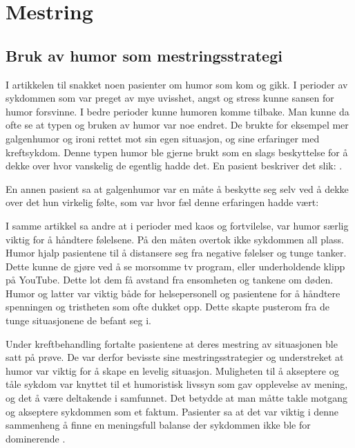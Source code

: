 \section{Mestring}

\subsection{Bruk av humor som mestringsstrategi}

I artikkelen til  snakket noen pasienter om humor som kom
og gikk. I perioder av sykdommen som var preget av mye uvisshet, angst og
stress kunne sansen for humor forsvinne. I bedre perioder kunne humoren komme
tilbake.  Man kunne da ofte se at typen og bruken av humor var noe endret. De
brukte for eksempel mer galgenhumor og ironi rettet mot sin egen situasjon, og
sine erfaringer med kreftsykdom. Denne typen humor ble gjerne brukt som en
slags beskyttelse for å dekke over hvor vanskelig de egentlig hadde det. En
pasient beskriver det slik: .

En annen pasient sa at galgenhumor var en måte å beskytte seg selv ved å dekke
over det hun virkelig følte, som var hvor fæl denne erfaringen hadde vært:

I samme artikkel sa andre at i perioder med kaos og fortvilelse, var humor
særlig viktig for å håndtere følelsene. På den måten overtok ikke sykdommen all
plass. Humor hjalp pasientene til å distansere seg fra negative følelser og
tunge tanker. Dette kunne de gjøre ved å se morsomme tv program, eller
underholdende klipp på YouTube. Dette lot dem få avstand fra ensomheten og
tankene om døden. Humor og latter var viktig både for helsepersonell og
pasientene for å håndtere spenningen og tristheten som ofte dukket opp. Dette
skapte pusterom fra de tunge situasjonene de befant seg i.

Under kreftbehandling fortalte pasientene at deres mestring av situasjonen ble
satt på prøve. De var derfor bevisste sine mestringsstrategier og understreket
at humor var viktig for å skape en levelig situasjon. Muligheten til å
akseptere og tåle sykdom var knyttet til et humoristisk livssyn som gav
opplevelse av mening, og det å være deltakende i samfunnet. Det betydde at man
måtte takle motgang og akseptere sykdommen som et faktum. Pasienter sa at det
var viktig i denne sammenheng å finne en meningsfull balanse der sykdommen ikke
ble for dominerende \cite{roaldsen2015}.

